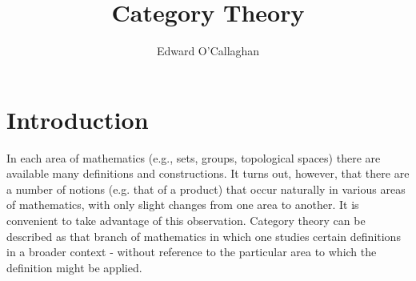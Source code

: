 \documentclass[10pt, oneside, reqno]{amsart}
\title{Category Theory}                               %
\author{Edward O'Callaghan}
\theoremstyle{plain}%
\theoremstyle{definition}
\theoremstyle{remark}
\begin{document}
\maketitle \tableofcontents \clearpage

\section{Introduction} %
\label{sec:introduction}
In each area of mathematics (e.g., sets, groups, topological spaces) there are available many definitions
and constructions. It turns out, however, that there are a number of notions (e.g. that of a product)
that occur naturally in various areas of mathematics, with only slight changes from one area to another.
It is convenient to take advantage of this observation. Category theory can be described as that branch of mathematics
in which one studies certain definitions in a broader context - without reference to the particular area to which
the definition might be applied.
\end{document}
